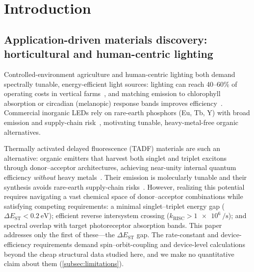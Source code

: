 
\section{Introduction}\label{sec:introduction}

\subsection{Application-driven materials discovery: horticultural and human-centric lighting}

Controlled-environment agriculture and human-centric lighting both demand
spectrally tunable, energy-efficient light sources: lighting can reach 40--60\% of
operating costs in vertical farms~\cite{Bugbee2016}, and matching emission to
chlorophyll absorption or circadian (melanopic) response bands improves
efficiency~\cite{Lichtenthaler1987, Lucas2014}. Commercial inorganic LEDs rely on
rare-earth phosphors (Eu, Tb, Y) with broad emission and supply-chain
risk~\cite{Yokoyama_2018}, motivating tunable, heavy-metal-free organic alternatives.

Thermally activated delayed fluorescence (TADF) materials are such an alternative:
organic emitters that harvest both singlet and triplet excitons through
donor--acceptor architectures, achieving near-unity internal quantum efficiency
\emph{without} heavy metals~\cite{Uoyama2012}.
Their emission is molecularly tunable and their synthesis avoids rare-earth
supply-chain risks~\cite{Golroudbary2022, Zapp2022}.
However, realizing this potential requires navigating a vast chemical space
of donor--acceptor combinations while satisfying competing requirements:
a minimal singlet--triplet energy gap ($\Delta E_\text{ST} < \qty{0.2}{\electronvolt}$);
efficient reverse intersystem crossing ($k_\text{RISC} > \qty{1e6}{\per\second}$);
and spectral overlap with target photoreceptor absorption bands. This paper
addresses only the first of these---the $\Delta E_\text{ST}$ gap. The
rate-constant and device-efficiency requirements demand spin--orbit-coupling and
device-level calculations beyond the cheap structural data studied here, and we
make no quantitative claim about them (\cref{subsec:limitations}).


